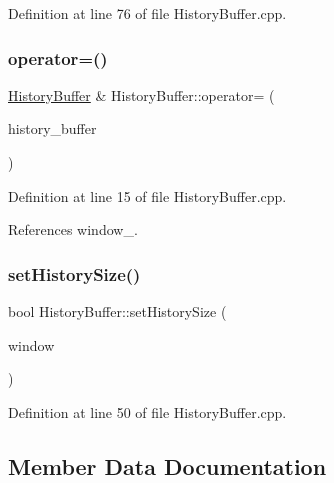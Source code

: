 Definition at line 76 of file History\+Buffer.\+cpp.

\mbox{\label{classbfl_1_1HistoryBuffer_a77a0d57c5413a374bf21d51693a81715}} 
\subsubsection{\texorpdfstring{operator=()}{operator=()}}
{\footnotesize\ttfamily \mbox{\hyperlink{classbfl_1_1HistoryBuffer}{History\+Buffer}} \& History\+Buffer\+::operator= (\begin{DoxyParamCaption}\item[{\mbox{\hyperlink{classbfl_1_1HistoryBuffer}{History\+Buffer}} \&\&}]{history\+\_\+buffer }\end{DoxyParamCaption})\hspace{0.3cm}{\ttfamily [noexcept]}}



Definition at line 15 of file History\+Buffer.\+cpp.



References window\+\_\+.

\mbox{\label{classbfl_1_1HistoryBuffer_a34bc31abe55f9d43575919a15a1f90c3}} 
\subsubsection{\texorpdfstring{set\+History\+Size()}{setHistorySize()}}
{\footnotesize\ttfamily bool History\+Buffer\+::set\+History\+Size (\begin{DoxyParamCaption}\item[{const unsigned int}]{window }\end{DoxyParamCaption})}



Definition at line 50 of file History\+Buffer.\+cpp.



\subsection{Member Data Documentation}
\mbox{\label{classbfl_1_1HistoryBuffer_a31dcf97b1b7fc9e97b8dd4774e24e4d7}} 
